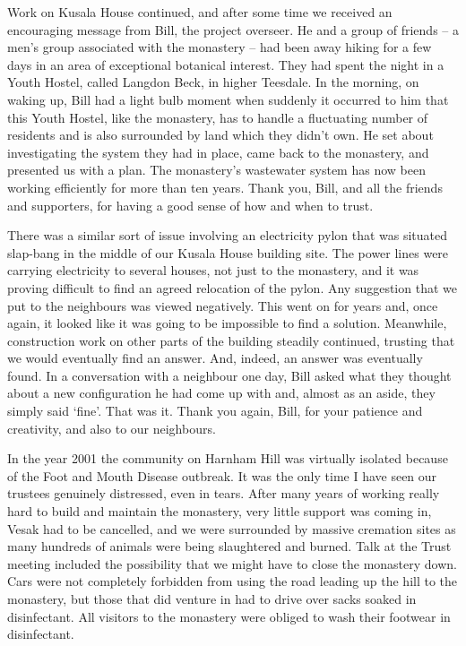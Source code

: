 Work on Kusala House continued, and after some time we received an
encouraging message from Bill, the project overseer. He and a group of
friends -- a men's group associated with the monastery -- had been away
hiking for a few days in an area of exceptional botanical interest. They
had spent the night in a Youth Hostel, called Langdon Beck\cite{langdon},
in higher Teesdale. In the morning, on waking up, Bill
had a light bulb moment when suddenly it occurred to him that this Youth
Hostel, like the monastery, has to handle a fluctuating number of
residents and is also surrounded by land which they didn't own. He set
about investigating the system they had in place, came back to the
monastery, and presented us with a plan. The monastery's wastewater
system has now been working efficiently for more than ten years. Thank
you, Bill, and all the friends and supporters, for having a good sense
of how and when to trust.

There was a similar sort of issue involving an electricity pylon that
was situated slap-bang in the middle of our Kusala House building site.
The power lines were carrying electricity to several houses, not just to
the monastery, and it was proving difficult to find an agreed relocation
of the pylon. Any suggestion that we put to the neighbours was viewed
negatively. This went on for years and, once again, it looked like it
was going to be impossible to find a solution. Meanwhile, construction
work on other parts of the building steadily continued, trusting that we
would eventually find an answer. And, indeed, an answer was eventually
found. In a conversation with a neighbour one day, Bill asked what they
thought about a new configuration he had come up with and, almost as an
aside, they simply said `fine'. That was it. Thank you again, Bill, for
your patience and creativity, and also to our neighbours.

In the year 2001 the community on Harnham Hill was virtually isolated
because of the Foot and Mouth Disease\cite{foot}
outbreak. It was the only time I have seen our
trustees genuinely distressed, even in tears. After many years of
working really hard to build and maintain the monastery, very little
support was coming in, Vesak had to be cancelled, and we were surrounded
by massive cremation sites as many hundreds of animals were being
slaughtered and burned. Talk at the Trust meeting included the
possibility that we might have to close the monastery down. Cars were
not completely forbidden from using the road leading up the hill to the
monastery, but those that did venture in had to drive over sacks soaked
in disinfectant. All visitors to the monastery were obliged to wash
their footwear in disinfectant.

